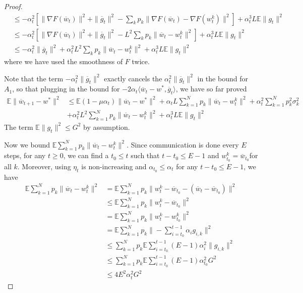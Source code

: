 \begin{proof}
\begin{align*}
	& \leq-\alpha_{t}^{2}\left[\|\nabla F(\overline{w}_{t})\|^{2}+\|\overline{g}_{t}\|^{2}-\sum_{k}p_{k}\|\nabla F(\overline{w}_{t})-\nabla F(w_{t}^{k})\|^{2}\right]+\alpha_{t}^{3}L\mathbb{E}\|g_{t}\|^{2}\\
	& \leq-\alpha_{t}^{2}\left[\|\nabla F(\overline{w}_{t})\|^{2}+\|\overline{g}_{t}\|^{2}-L^{2}\sum_{k}p_{k}\|\overline{w}_{t}-w_{t}^{k}\|^{2}\right]+\alpha_{t}^{3}L\mathbb{E}\|g_{t}\|^{2}\\
	& \leq-\alpha_{t}^{2}\|\overline{g}_{t}\|^{2}+\alpha_{t}^{2}L^{2}\sum_{k}p_{k}\|\overline{w}_{t}-w_{t}^{k}\|^{2}+\alpha_{t}^{3}L\mathbb{E}\|g_{t}\|^{2}
	\end{align*}
	where we have used the smoothness of $F$ twice. 
	
	Note that the term $-\alpha_{t}^{2}\|\overline{g}_{t}\|^{2}$ exactly
	cancels the $\alpha_{t}^{2}\|\overline{g}_{t}\|^{2}$ in the bound
	for $A_{1}$, so that plugging in the bound for $-2\alpha_{t}\langle\overline{w}_{t}-w^{\ast},\overline{g}_{t}\rangle$,
	we have so far proved 
	\begin{align*}
	\mathbb{E}\|\overline{w}_{t+1}-w^{\ast}\|^{2} & \leq\mathbb{E}(1-\mu\alpha_{t})\|\overline{w}_{t}-w^{\ast}\|^{2}+\alpha_{t}L\sum_{k=1}^{N}p_{k}\|\overline{w}_{t}-w_{t}^{k}\|^{2}+\alpha_{t}^{2}\sum_{k=1}^{N}p_{k}^{2}\sigma_{k}^{2}\\
	& +\alpha_{t}^{2}L^{2}\sum_{k=1}^{N}p_{k}\|\overline{w}_{t}-w_{t}^{k}\|^{2}+\alpha_{t}^{3}L\mathbb{E}\|g_{t}\|^{2}
	\end{align*}
	The term $\mathbb{E}\|g_{t}\|^{2}\leq G^{2}$ by assumption. 
	
	Now we bound $\mathbb{E}\sum_{k=1}^{N}p_{k}\|\overline{w}_{t}-w_{t}^{k}\|^{2}$.
	Since communication is done every $E$ steps, for any $t\geq0$, we
	can find a $t_{0}\leq t$ such that $t-t_{0}\leq E-1$ and $w_{t_{0}}^{k}=\overline{w}_{t_{0}}$for
	all $k$. Moreover, using $\eta_{t}$ is non-increasing and $\alpha_{t_{0}}\leq\alpha{}_{t}$
	for any $t-t_{0}\leq E-1$, we have 
	\begin{align*}
	\mathbb{E}\sum_{k=1}^{N}p_{k}\|\overline{w}_{t}-w_{t}^{k}\|^{2} & =\mathbb{E}\sum_{k=1}^{N}p_{k}\|w_{t}^{k}-\overline{w}_{t_{0}}-(\overline{w}_{t}-\overline{w}_{t_{0}})\|^{2}\\
	& \leq\mathbb{E}\sum_{k=1}^{N}p_{k}\|w_{t}^{k}-\overline{w}_{t_{0}}\|^{2}\\
	& =\mathbb{E}\sum_{k=1}^{N}p_{k}\|w_{t}^{k}-w_{t_{0}}^{k}\|^{2}\\
	& =\mathbb{E}\sum_{k=1}^{N}p_{k}\|-\sum_{i=t_{0}}^{t-1}\alpha_{i}g_{i,k}\|^{2}\\
	& \leq\sum_{k=1}^{N}p_{k}\mathbb{E}\sum_{i=t_{0}}^{t-1}(E-1)\alpha_{i}^{2}\|g_{i,k}\|^{2}\\
	& \leq\sum_{k=1}^{N}p_{k}\mathbb{E}\sum_{i=t_{0}}^{t-1}(E-1)\alpha_{t_{0}}^{2}G^{2}\\
	& \leq4E^{2}\alpha_{t}^{2}G^{2}
	\end{align*}
	

\end{proof}
